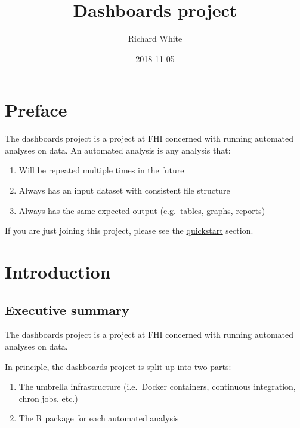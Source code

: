 \documentclass[12pt,]{article}
\title{Dashboards project}
\author{Richard White}
\date{2018-11-05}
\providecommand{\tightlist}{%
  \setlength{\itemsep}{0pt}\setlength{\parskip}{0pt}}
\begin{document}
\maketitle

{
\hypersetup{linkcolor=black}
\setcounter{tocdepth}{2}
\tableofcontents
}
\listoftables
\listoffigures
\section*{Preface}\label{preface}

The dashboards project is a project at FHI concerned with running
automated analyses on data. An automated analysis is any analysis that:

\begin{enumerate}
\def\labelenumi{\arabic{enumi}.}
\tightlist
\item
  Will be repeated multiple times in the future
\item
  Always has an input dataset with consistent file structure
\item
  Always has the same expected output (e.g.~tables, graphs, reports)
\end{enumerate}

If you are just joining this project, please see the
\protect\hyperlink{quickstart}{quickstart} section.

\section{Introduction}\label{introduction}

\subsection{Executive summary}\label{executive-summary}

The dashboards project is a project at FHI concerned with running
automated analyses on data.

In principle, the dashboards project is split up into two parts:

\begin{enumerate}
\def\labelenumi{\arabic{enumi}.}
\tightlist
\item
  The umbrella infrastructure (i.e.~Docker containers, continuous
  integration, chron jobs, etc.)
\item
  The R package for each automated analysis
\end{enumerate}
\end{document}
